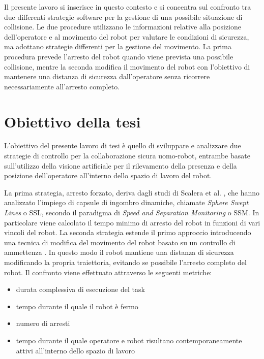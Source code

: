 Il presente lavoro si inserisce in questo contesto e si concentra sul confronto tra due differenti strategie software per la gestione di una possibile situazione di collisione. Le due procedure utilizzano le informazioni relative alla posizione dell'operatore e al movimento del robot per valutare le condizioni di sicurezza, ma adottano strategie differenti per la gestione del movimento. La prima procedura prevede l'arresto del robot quando viene prevista una possibile collisione, mentre la seconda modifica il movimento del robot con l'obiettivo di mantenere una distanza di sicurezza dall'operatore senza ricorrere necessariamente all'arresto completo.

\section{Obiettivo della tesi}

L'obiettivo del presente lavoro di tesi è quello di sviluppare e analizzare due strategie di controllo per la collaborazione sicura uomo-robot, entrambe basate sull'utilizzo della visione artificiale per il rilevamento della presenza e della posizione dell'operatore all'interno dello spazio di lavoro del robot.

La prima strategia, arresto forzato, deriva dagli studi di Scalera et al. \cite{Scalera2022}, che hanno analizzato l'impiego di capsule di ingombro dinamiche, chiamate \textit{Sphere Swept Lines} o SSL, secondo il paradigma di \textit{Speed and Separation Monitoring} o SSM. In particolare viene calcolato il tempo minimo di arresto del robot in funzioni di vari vincoli del robot. 
La seconda strategia estende il primo approccio introducendo una tecnica di modifica del movimento del robot basato su un controllo di ammettenza \cite{Qyrani2026}. In questo modo il robot mantiene una distanza di sicurezza modificando la propria traiettoria, evitando se possibile l'arresto completo del robot.
Il confronto viene effettuato attraverso le seguenti metriche:
\begin{itemize}
    \item durata complessiva di esecuzione del task
    \item tempo durante il quale il robot è fermo
    \item numero di arresti
    \item tempo durante il quale operatore e robot risultano contemporaneamente attivi all'interno dello spazio di lavoro
\end{itemize}

